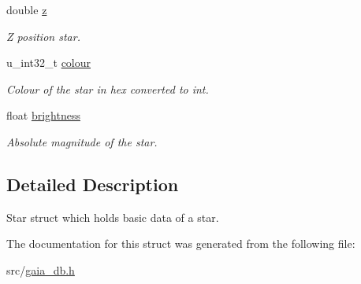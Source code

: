 \begin{DoxyCompactItemize}
\mbox{\label{struct__star_a07a680ef4c9c4e39d04d7e96722d5eca}} 
double \mbox{\hyperlink{struct__star_a07a680ef4c9c4e39d04d7e96722d5eca}{z}}
\begin{DoxyCompactList}\small\item\em Z position star. \end{DoxyCompactList}\item 
\mbox{\label{struct__star_a1d9d46186ac4cb48396d3f4f4126eb80}} 
u\+\_\+int32\+\_\+t \mbox{\hyperlink{struct__star_a1d9d46186ac4cb48396d3f4f4126eb80}{colour}}
\begin{DoxyCompactList}\small\item\em Colour of the star in hex converted to int. \end{DoxyCompactList}\item 
\mbox{\label{struct__star_a3c5bce25651144dc9aa1297752ab8c56}} 
float \mbox{\hyperlink{struct__star_a3c5bce25651144dc9aa1297752ab8c56}{brightness}}
\begin{DoxyCompactList}\small\item\em Absolute magnitude of the star. \end{DoxyCompactList}\end{DoxyCompactItemize}


\subsection{Detailed Description}
Star struct which holds basic data of a star. 

The documentation for this struct was generated from the following file\+:\begin{DoxyCompactItemize}
\item 
src/\mbox{\hyperlink{gaia__db_8h}{gaia\+\_\+db.\+h}}\end{DoxyCompactItemize}
